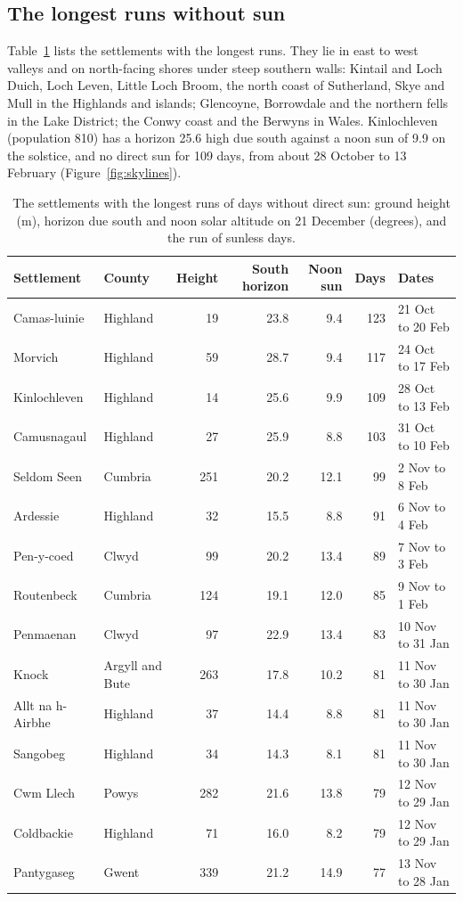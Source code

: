 \documentclass[11pt,a4paper]{article}
\begin{document}
\subsection{The longest runs without sun}
Table~\ref{tab:top} lists the settlements with the longest runs. They lie in east to west valleys and on north-facing shores under steep southern walls: Kintail and Loch Duich, Loch Leven, Little Loch Broom, the north coast of Sutherland, Skye and Mull in the Highlands and islands; Glencoyne, Borrowdale and the northern fells in the Lake District; the Conwy coast and the Berwyns in Wales. Kinlochleven (population 810) has a horizon 25.6\textdegree{} high due south against a noon sun of 9.9\textdegree{} on the solstice, and no direct sun for 109 days, from about 28 October to 13 February (Figure~\ref{fig:skylines}).

\begin{table}[tbp]\centering\small\caption{The settlements with the longest runs of days without direct sun: ground height (m), horizon due south and noon solar altitude on 21 December (degrees), and the run of sunless days.}\label{tab:top}\begin{tabular}{llrrrrl}\toprule Settlement & County & Height & South horizon & Noon sun & Days & Dates\\\midrule
Camas-luinie & Highland & 19 & 23.8 & 9.4 & 123 & 21 Oct to 20 Feb\\
Morvich & Highland & 59 & 28.7 & 9.4 & 117 & 24 Oct to 17 Feb\\
Kinlochleven & Highland & 14 & 25.6 & 9.9 & 109 & 28 Oct to 13 Feb\\
Camusnagaul & Highland & 27 & 25.9 & 8.8 & 103 & 31 Oct to 10 Feb\\
Seldom Seen & Cumbria & 251 & 20.2 & 12.1 & 99 & 2 Nov to 8 Feb\\
Ardessie & Highland & 32 & 15.5 & 8.8 & 91 & 6 Nov to 4 Feb\\
Pen-y-coed & Clwyd & 99 & 20.2 & 13.4 & 89 & 7 Nov to 3 Feb\\
Routenbeck & Cumbria & 124 & 19.1 & 12.0 & 85 & 9 Nov to 1 Feb\\
Penmaenan & Clwyd & 97 & 22.9 & 13.4 & 83 & 10 Nov to 31 Jan\\
Knock & Argyll and Bute & 263 & 17.8 & 10.2 & 81 & 11 Nov to 30 Jan\\
Allt na h-Airbhe & Highland & 37 & 14.4 & 8.8 & 81 & 11 Nov to 30 Jan\\
Sangobeg & Highland & 34 & 14.3 & 8.1 & 81 & 11 Nov to 30 Jan\\
Cwm Llech & Powys & 282 & 21.6 & 13.8 & 79 & 12 Nov to 29 Jan\\
Coldbackie & Highland & 71 & 16.0 & 8.2 & 79 & 12 Nov to 29 Jan\\
Pantygaseg & Gwent & 339 & 21.2 & 14.9 & 77 & 13 Nov to 28 Jan\\
\bottomrule\end{tabular}\end{table}
\end{document}
